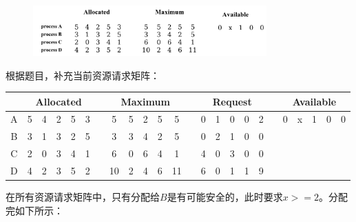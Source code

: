 
\begin{figure}[H]
    \centering
    \includegraphics[width=0.8\textwidth]{img/6_1.png}
\end{figure}

\begin{solution}

根据题目，补充当前资源请求矩阵：

\begin{table}[H]
    \begin{center}
    \begin{tabular}{|c|c|c|c|c|c|c|c|c|c|c|c|c|c|c|c|c|c|c|c|c|c|c|c|}
    \hline
     & \multicolumn{ 5}{c|}{Allocated} &  & \multicolumn{ 5}{c|}{Maximum} &  & \multicolumn{ 5}{c|}{Request} &  & \multicolumn{ 5}{c|}{Available} \\ \hline
    A & 5 & 4 & 2 & 5 & 3 &  & 5 & 5 & 2 & 5 & 5 &  & 0 & 1 & 0 & 0 & 2 &  & 0 & x & 1 & 0 & 0 \\ \hline
    B & 3 & 1 & 3 & 2 & 5 &  & 3 & 3 & 4 & 2 & 5 &  & 0 & 2 & 1 & 0 & 0 &  &  &  &  &  &  \\ \hline
    C & 2 & 0 & 3 & 4 & 1 &  & 6 & 0 & 6 & 4 & 1 &  & 4 & 0 & 3 & 0 & 0 &  &  &  &  &  &  \\ \hline
    D & 4 & 2 & 3 & 5 & 2 &  & 10 & 2 & 4 & 6 & 11 &  & 6 & 0 & 1 & 1 & 9 &  &  &  &  &  &  \\ \hline
    \end{tabular}
    \end{center}
\end{table}


在所有资源请求矩阵中，只有分配给$B$是有可能安全的，此时要求$x>=2$。分配完如下所示：


\end{solution}
